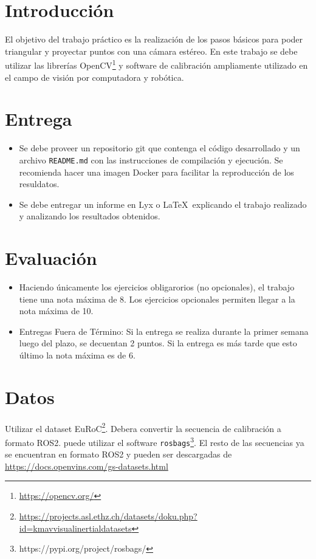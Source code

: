 \documentclass[tp]{lcc}
\begin{document}
\maketitle

\section{Introducción}

El objetivo del trabajo práctico es la realización de los pasos básicos para poder triangular y proyectar puntos con una cámara estéreo. En este trabajo se debe utilizar  las librerías OpenCV\footnote{\url{https://opencv.org/}} y software de calibración ampliamente utilizado en el campo de visión por computadora y robótica.


\section{Entrega}
\begin{itemize}
	\item Se debe proveer un repositorio git que contenga el código desarrollado y un archivo \lstinline{README.md} con las instrucciones de compilación y ejecución. Se recomienda hacer una imagen Docker para facilitar la reproducción de los resuldatos.
    
	\item Se debe entregar un informe en Lyx o \LaTeX\  explicando el trabajo realizado y analizando los resultados obtenidos.
\end{itemize}

\section{Evaluación}
\begin{itemize}
    \item Haciendo únicamente los ejercicios obligarorios (no opcionales), el trabajo tiene una nota máxima de 8. Los ejercicios opcionales permiten llegar a la nota máxima de 10.
    \item Entregas Fuera de Término: Si la entrega se realiza durante la primer semana luego del plazo, se decuentan 2 puntos. Si la entrega es más tarde que esto último la nota máxima es de 6.
\end{itemize}

\section{Datos}
Utilizar el dataset EuRoC\footnote{\url{https://projects.asl.ethz.ch/datasets/doku.php?id=kmavvisualinertialdatasets}}. Debera convertir la secuencia de calibración a formato ROS2. puede utilizar el software \lstinline{rosbags}\footnote{https://pypi.org/project/rosbags/}. El resto de las secuencias ya se encuentran en formato ROS2 y pueden ser descargadas de \url{https://docs.openvins.com/gs-datasets.html}
\end{document}
